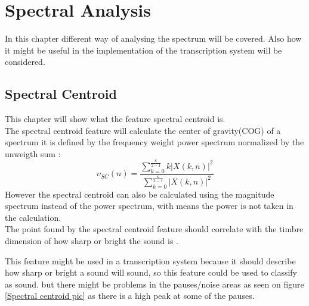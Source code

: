 \section{Spectral Analysis}
In this chapter different way of analysing the spectrum will be covered. Also how it might be useful in the implementation of the transcription system will be considered.
\subsection{Spectral Centroid}
This chapter will show what the feature spectral centroid is.\\
The spectral centroid feature will calculate the center of gravity(COG) of a spectrum it is defined by the frequency weight power spectrum normalized by the unweigth sum \citep{ACA}:
\begin{equation}\label{Spectral Centroid eq}
	\upsilon_{SC}(n) = \frac{\displaystyle\sum_{k = 0}^{\frac{\kappa}{2-1}} k\vert X(k,n) \vert^2}{\displaystyle\sum_{k = 0}^{\frac{\kappa}{2-1}} \vert X(k,n) \vert^2 }    
\end{equation} 
However the spectral centroid can also be calculated using the magnitude spectrum instead of the power spectrum, with means the power is not taken in the calculation\citep{ACA}.
\\
The point found by the spectral centroid feature should correlate with the timbre dimension of how sharp or bright the sound is \citep{ACA}. 

This feature might be used in a transcription system because it should describe how sharp or bright a sound will sound, so this feature could be used to classify as sound. but there might be problems in the pauses/noise areas as seen on figure \ref{Spectral centroid pic} as there is a high peak at some of the pauses. 
